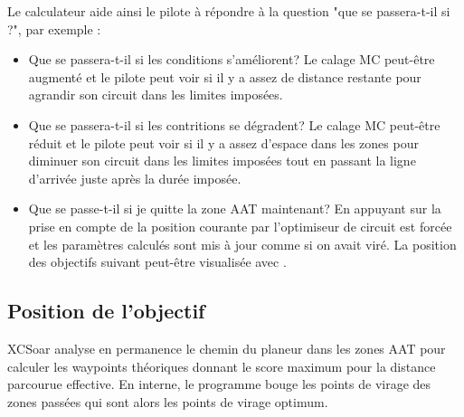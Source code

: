 Le calculateur aide ainsi le pilote à répondre à la question "que se passera-t-il si ?", par exemple :
\begin{itemize}
\item Que se passera-t-il si les conditions s'améliorent? Le calage MC peut-être augmenté et le pilote peut voir si il y a assez de distance restante pour agrandir son circuit dans les limites imposées. 
\item Que se passera-t-il si les contritions se dégradent? Le calage MC peut-être réduit et le pilote peut voir si il y a assez d'espace dans les zones pour diminuer son circuit dans les limites imposées tout en passant la ligne d'arrivée juste après la durée imposée.
\item Que se passe-t-il si je quitte la zone AAT maintenant? En appuyant sur  la prise en compte de la position courante par l'optimiseur de circuit est forcée et les paramètres calculés sont mis à jour comme si on avait viré. La position des objectifs suivant peut-être visualisée avec .
\end{itemize}

\subsection*{Position de l'objectif}

XCSoar analyse en permanence le chemin du planeur dans les zones AAT pour calculer les waypoints théoriques donnant le score maximum pour la distance parcourue effective. En interne, le programme bouge les points de virage des zones passées qui sont alors les points de virage optimum. 

